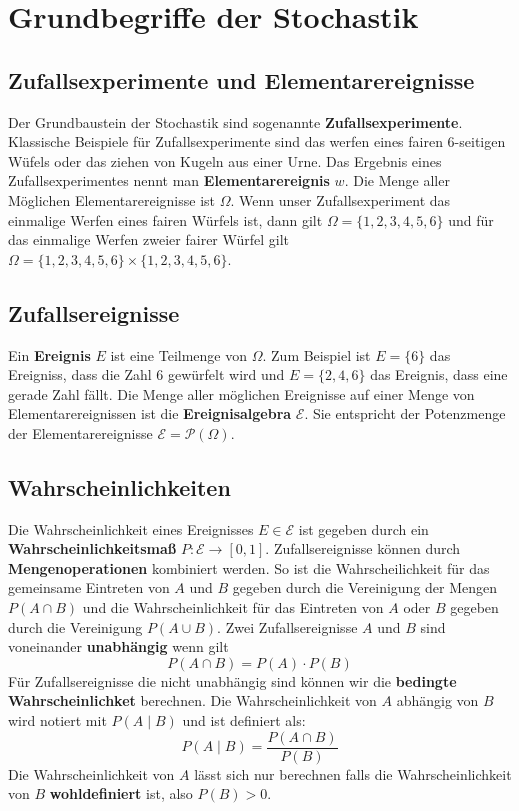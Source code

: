 \section{Grundbegriffe der Stochastik}

\subsection{Zufallsexperimente und Elementarereignisse}
Der Grundbaustein der Stochastik sind sogenannte \textbf{Zufallsexperimente}. Klassische Beispiele für Zufallsexperimente sind das werfen eines fairen 6-seitigen Wüfels oder das ziehen von Kugeln aus einer Urne. Das Ergebnis eines Zufallsexperimentes nennt man \textbf{Elementarereignis} $w$. Die Menge aller Möglichen Elementarereignisse ist $\Omega$. Wenn unser Zufallsexperiment das einmalige Werfen eines fairen Würfels ist, dann gilt $\Omega = \{1, 2, 3, 4, 5, 6\}$ und für das einmalige Werfen zweier fairer Würfel gilt $\Omega = \{1,2,3,4,5,6\} \times \{1,2,3,4,5,6\} $. 
\subsection{Zufallsereignisse}
Ein \textbf{Ereignis} $E$ ist eine Teilmenge von $\Omega$. Zum Beispiel ist $E =\{6\}$ das Ereigniss, dass die Zahl 6 gewürfelt wird und $E=\{2,4,6\}$ das Ereignis, dass eine gerade Zahl fällt. Die Menge aller möglichen Ereignisse auf einer Menge von Elementarereignissen ist die \textbf{Ereignisalgebra} $\mathcal{E}$. Sie entspricht der Potenzmenge der Elementarereignisse $\mathcal{E} = \mathcal{P}(\Omega)$.
\subsection{Wahrscheinlichkeiten}
Die Wahrscheinlichkeit eines Ereignisses $E \in \mathcal{E}$ ist gegeben durch ein \textbf{Wahrscheinlichkeitsmaß} $P: \mathcal{E}\rightarrow [0,1]$. Zufallsereignisse können durch \textbf{Mengenoperationen} kombiniert werden. So ist die Wahrscheilichkeit für das gemeinsame Eintreten von $A$ und $B$ gegeben durch die Vereinigung der Mengen $P(A \cap B)$ und die Wahrscheinlichkeit für das Eintreten von $A$ oder $B$ gegeben durch die Vereinigung $P(A \cup B)$. Zwei Zufallsereignisse $A$ und $B$ sind voneinander \textbf{unabhängig} wenn gilt
\begin{equation}
    P(A \cap B) = P(A) \cdot P(B)
\end{equation}
Für Zufallsereignisse die nicht unabhängig sind können wir die \textbf{bedingte Wahrscheinlichket} berechnen. Die Wahrscheinlichkeit von $A$ abhängig von $B$ wird notiert mit $P(A \mid B)$ und ist definiert als:
\begin{equation}
    P(A \mid B) = \frac{P(A \cap B)}{P(B)}
\end{equation}
Die Wahrscheinlichkeit von $A$ lässt sich nur berechnen falls die Wahrscheinlichkeit von $B$ \textbf{wohldefiniert} ist, also $P(B) > 0$.
